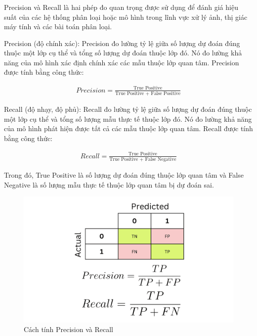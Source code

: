 \documentclass[a4paper]{article}
\begin{document}
\subsubsection{}

Precision và Recall là hai phép đo quan trọng được sử dụng để đánh giá hiệu suất của các hệ thống phân loại hoặc mô hình trong lĩnh vực xử lý ảnh, thị giác máy tính và các bài toán phân loại.

Precision (độ chính xác): Precision đo lường tỷ lệ giữa số lượng dự đoán đúng thuộc một lớp cụ thể và tổng số lượng dự đoán thuộc lớp đó. Nó đo lường khả năng của mô hình xác định chính xác các mẫu thuộc lớp quan tâm. Precision được tính bằng công thức:

\begin{align*}
	Precision = \frac{\text{True Positive}}{\text{True Positive + False Positive}}
\end{align*}

Recall (độ nhạy, độ phủ): Recall đo lường tỷ lệ giữa số lượng dự đoán đúng thuộc một lớp cụ thể và tổng số lượng mẫu thực tế thuộc lớp đó. Nó đo lường khả năng của mô hình phát hiện được tất cả các mẫu thuộc lớp quan tâm. Recall được tính bằng công thức:

\begin{align*}
	Recall = \frac{\text{True Positive}}{\text{True Positive + False Negative}}
\end{align*}

Trong đó, True Positive là số lượng dự đoán đúng thuộc lớp quan tâm và False Negative là số lượng mẫu thực tế thuộc lớp quan tâm bị dự đoán sai.

\begin{figure}[h]
	\centering
	\includegraphics[width=0.7\linewidth]{fig/selvaraj_confusion_matrix_precision_recall_explained_12}
	\caption{Cách tính Precision và Recall}
	\label{fig:selvarajconfusionmatrixprecisionrecallexplained12}
\end{figure}
\end{document}
